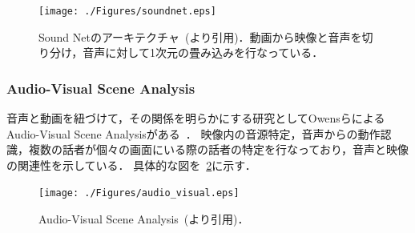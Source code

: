 \begin{figure}[htbp]
 \begin{center}
  \texttt{[image: ./Figures/soundnet.eps]}
  \caption{Sound Netのアーキテクチャ~(\cite{aytar2016soundnet}より引用)．動画から映像と音声を切り分け，音声に対して1次元の畳み込みを行なっている．}
  \label{soundnet_network}
 \end{center}
\end{figure}

\subsubsection{Audio-Visual Scene Analysis}
音声と動画を紐づけて，その関係を明らかにする研究としてOwensらによるAudio-Visual Scene Analysisがある~\cite{multisensory2018}．
映像内の音源特定，音声からの動作認識，複数の話者が個々の画面にいる際の話者の特定を行なっており，音声と映像の関連性を示している．
具体的な図を~\ref{audio_visual}に示す．
\begin{figure}[htbp]
 \begin{center}
  \texttt{[image: ./Figures/audio\_visual.eps]}
  \caption{Audio-Visual Scene Analysis~(\cite{multisensory2018}より引用)．}
  \label{audio_visual}
 \end{center}
\end{figure}
